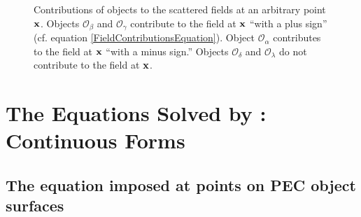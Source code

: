 \documentclass[letterpaper]{article}
\begin{document}
\begin{figure}
\begin{center}
\caption{Contributions of objects to the scattered fields at 
         an arbitrary point $\mathbf{x}$. Objects $\mathcal{O}_\beta$
         and $\mathcal{O}_\gamma$ contribute
         to the field at $\mathbf{x}$ ``with a plus sign'' 
         (cf. equation \ref{FieldContributionsEquation}).
         Object $\mathcal{O}_\alpha$ 
         contributes to the field at $\mathbf{x}$ ``with a minus
         sign.'' Objects $\mathcal{O}_\delta$ and $\mathcal{O}_\lambda$
         do not contribute to the field at $\mathbf{x}$.}
\label{FieldContributionsFigure}
\end{center}
\end{figure}

\newpage
\section{The Equations Solved by \ls: Continuous Forms}

\subsection{The equation imposed at points on PEC object surfaces}
\end{document}
